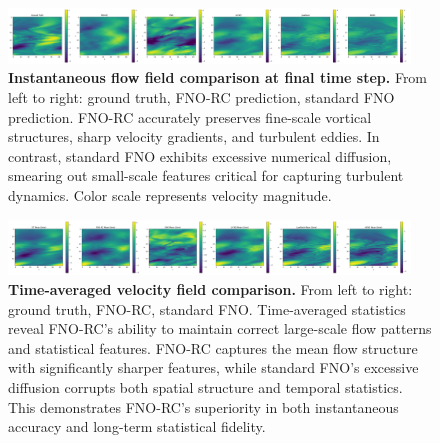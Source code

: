 \documentclass[11pt]{article}
\begin{document}
\begin{figure}[p]
\centering
\includegraphics[width=0.95\textwidth]{../实验图/final_slice.png}
\caption{\textbf{Instantaneous flow field comparison at final time step.} From left to right: ground truth, FNO-RC prediction, standard FNO prediction. FNO-RC accurately preserves fine-scale vortical structures, sharp velocity gradients, and turbulent eddies. In contrast, standard FNO exhibits excessive numerical diffusion, smearing out small-scale features critical for capturing turbulent dynamics. Color scale represents velocity magnitude.}
\label{fig:flow_instant}
\end{figure}

\begin{figure}[p]
\centering
\includegraphics[width=0.95\textwidth]{../实验图/mean_time.png}
\caption{\textbf{Time-averaged velocity field comparison.} From left to right: ground truth, FNO-RC, standard FNO. Time-averaged statistics reveal FNO-RC's ability to maintain correct large-scale flow patterns and statistical features. FNO-RC captures the mean flow structure with significantly sharper features, while standard FNO's excessive diffusion corrupts both spatial structure and temporal statistics. This demonstrates FNO-RC's superiority in both instantaneous accuracy and long-term statistical fidelity.}
\label{fig:flow_mean}
\end{figure}
\end{document}
